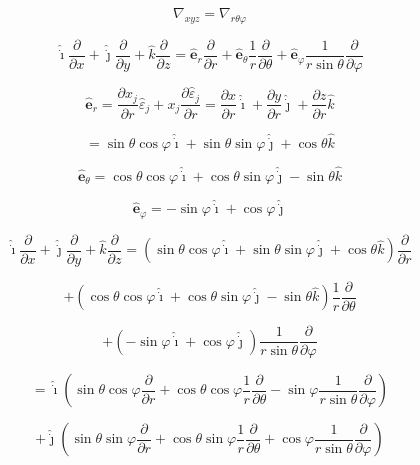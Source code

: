 \documentclass[12pt]{article}
\begin{document}
\[
    \nabla_{xyz} = \nabla_{r \theta \varphi }
\]

\[
    \hat{\dot{\imath}} \frac{\partial}{\partial x}
    + \hat{\dot{\jmath}} \frac{\partial}{\partial y}
    +  \hat{k} \frac{\partial}{\partial z} = \hat{\mathbf{e}}_r \frac{\partial}{\partial r}
    + \hat{\mathbf{e}}_\theta \frac{1}{r} \frac{\partial}{\partial \theta}
    + \hat{\mathbf{e}}_\varphi \frac{1}{r \sin{\theta}} \frac{\partial}{\partial \varphi}
\]

\[
    \hat{\mathbf{e}}_r = \frac{\partial x_j}{\partial r} \hat{\varepsilon}_j
    + x_j \frac{\partial \hat{\varepsilon}_j}{\partial r} = \frac{\partial x}{\partial r} \hat{\dot{\imath}}
    + \frac{\partial y}{\partial r} \hat{\dot{\jmath}} + \frac{\partial z}{\partial r} \hat{k}
\]

\[
    = \sin{\theta} \cos{\varphi} \hat{\dot{\imath}} + \sin{\theta} \sin{\varphi} \hat{\dot{\jmath}}
    + \cos{\theta} \hat{k}
\]

\[
    \hat{\mathbf{e}}_\theta = \cos{\theta} \cos{\varphi} \hat{\dot{\imath}}
    + \cos{\theta} \sin{\varphi} \hat{\dot{\jmath}} - \sin{\theta} \hat{k}
\]

\[
    \hat{\mathbf{e}}_\varphi = -\sin{\varphi} \hat{\dot{\imath}} + \cos{\varphi} \hat{\dot{\jmath}}
\]

\[
    \hat{\dot{\imath}} \frac{\partial}{\partial x} + \hat{\dot{\jmath}} \frac{\partial}{\partial y}
    +  \hat{k} \frac{\partial}{\partial z} =
    \left(
    \sin{\theta} \cos{\varphi} \hat{\dot{\imath}}
    + \sin{\theta} \sin{\varphi} \hat{\dot{\jmath}}
    + \cos{\theta} \hat{k}
    \right)  \frac{\partial}{\partial r}
\]

\[
    + \left(
    \cos{\theta} \cos{\varphi} \hat{\dot{\imath}} + \cos{\theta} \sin{\varphi} \hat{\dot{\jmath}}
    - \sin{\theta} \hat{k}
    \right) \frac{1}{r} \frac{\partial}{\partial \theta}
\]

\[
    + \left(-\sin{\varphi} \hat{\dot{\imath}} + \cos{\varphi} \hat{\dot{\jmath}}\right)
    \frac{1}{r \sin{\theta}} \frac{\partial}{\partial \varphi}
\]

\[
    = \hat{\dot{\imath}}
    \left(
    \sin{\theta} \cos{\varphi} \frac{\partial}{\partial r}
    + \cos{\theta} \cos{\varphi} \frac{1}{r} \frac{\partial}{\partial \theta}
    - \sin{\varphi} \frac{1}{r \sin{\theta}} \frac{\partial}{\partial \varphi}
    \right)
\]

\[
    + \hat{\dot{\jmath}}
    \left(
    \sin{\theta} \sin{\varphi} \frac{\partial}{\partial r}
    + \cos{\theta} \sin{\varphi} \frac{1}{r} \frac{\partial}{\partial \theta}
    + \cos{\varphi} \frac{1}{r \sin{\theta}} \frac{\partial}{\partial \varphi}
    \right)
\]
\end{document}
